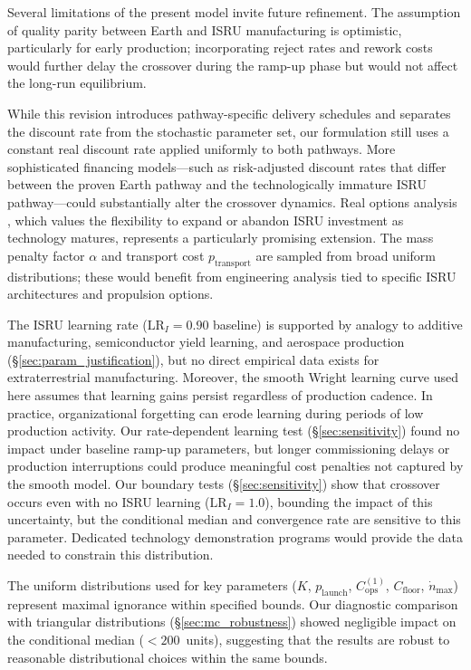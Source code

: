 \documentclass[preprint,12pt]{elsarticle}
\begin{document}
Several limitations of the present model invite future refinement. The assumption of quality parity between Earth and ISRU manufacturing is optimistic, particularly for early production; incorporating reject rates and rework costs would further delay the crossover during the ramp-up phase but would not affect the long-run equilibrium.

While this revision introduces pathway-specific delivery schedules and separates the discount rate from the stochastic parameter set, our formulation still uses a constant real discount rate applied uniformly to both pathways. More sophisticated financing models---such as risk-adjusted discount rates that differ between the proven Earth pathway and the technologically immature ISRU pathway---could substantially alter the crossover dynamics. Real options analysis \cite{dixit1994}, which values the flexibility to expand or abandon ISRU investment as technology matures, represents a particularly promising extension. The mass penalty factor $\alpha$ and transport cost $p_{\mathrm{transport}}$ are sampled from broad uniform distributions; these would benefit from engineering analysis tied to specific ISRU architectures and propulsion options.

The ISRU learning rate ($\mathrm{LR}_I = 0.90$ baseline) is supported by analogy to additive manufacturing, semiconductor yield learning, and aerospace production (\S\ref{sec:param_justification}), but no direct empirical data exists for extraterrestrial manufacturing. Moreover, the smooth Wright learning curve used here assumes that learning gains persist regardless of production cadence. In practice, organizational forgetting \cite{benkard2000} can erode learning during periods of low production activity. Our rate-dependent learning test (\S\ref{sec:sensitivity}) found no impact under baseline ramp-up parameters, but longer commissioning delays or production interruptions could produce meaningful cost penalties not captured by the smooth model. Our boundary tests (\S\ref{sec:sensitivity}) show that crossover occurs even with no ISRU learning ($\mathrm{LR}_I = 1.0$), bounding the impact of this uncertainty, but the conditional median and convergence rate are sensitive to this parameter. Dedicated technology demonstration programs would provide the data needed to constrain this distribution.

The uniform distributions used for key parameters ($K$, $p_{\mathrm{launch}}$, $C_{\mathrm{ops}}^{(1)}$, $C_{\mathrm{floor}}$, $\dot{n}_{\max}$) represent maximal ignorance within specified bounds. Our diagnostic comparison with triangular distributions (\S\ref{sec:mc_robustness}) showed negligible impact on the conditional median ($<200$~units), suggesting that the results are robust to reasonable distributional choices within the same bounds.
\end{document}
